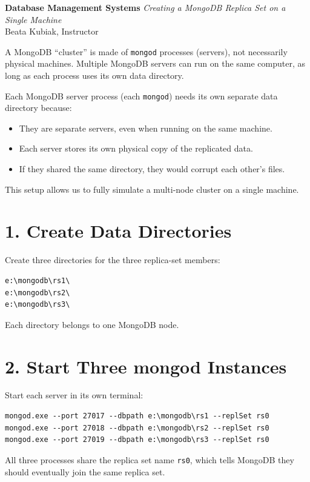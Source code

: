 \documentclass[9pt]{article}
\begin{document}
\noindent
\textbf{Database Management Systems}%
\hfill%
\textit{Creating a MongoDB Replica Set on a Single Machine}\\
Beata Kubiak, Instructor

\medskip

A MongoDB ``cluster'' is made of \texttt{mongod} processes (servers), not
necessarily physical machines. Multiple MongoDB servers can run on the same
computer, as long as each process uses its own data directory.

Each MongoDB server process (each \texttt{mongod}) needs its own separate data
directory because:
\begin{itemize}
    \item They are separate servers, even when running on the same machine.
    \item Each server stores its own physical copy of the replicated data.
    \item If they shared the same directory, they would corrupt each other's files.
\end{itemize}

This setup allows us to fully simulate a multi-node cluster on a single machine.

\section*{1. Create Data Directories}

Create three directories for the three replica-set members:

\begin{verbatim}
e:\mongodb\rs1\
e:\mongodb\rs2\
e:\mongodb\rs3\
\end{verbatim}

Each directory belongs to one MongoDB node.

\section*{2. Start Three mongod Instances}

Start each server in its own terminal:

\begin{verbatim}
mongod.exe --port 27017 --dbpath e:\mongodb\rs1 --replSet rs0
mongod.exe --port 27018 --dbpath e:\mongodb\rs2 --replSet rs0
mongod.exe --port 27019 --dbpath e:\mongodb\rs3 --replSet rs0
\end{verbatim}

All three processes share the replica set name \texttt{rs0}, which tells MongoDB
they should eventually join the same replica set.
\end{document}
